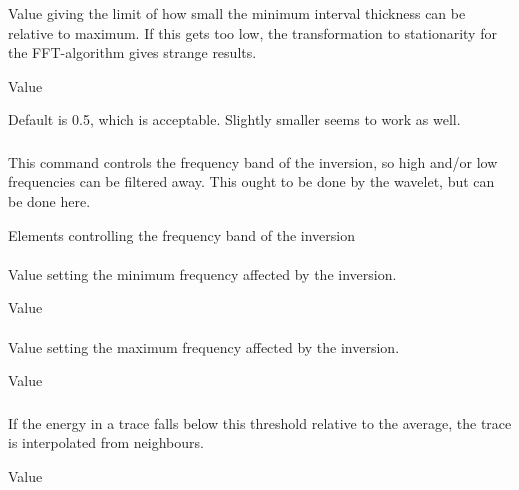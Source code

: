 \subsubsection{}
 \slist
   \item \Description Value giving the limit of how small the minimum interval thickness can be relative to maximum. If this gets too low, the transformation to stationarity for the FFT-algorithm gives strange results.
   \item \Argument Value
   \item \Default Default is 0.5, which is acceptable. Slightly smaller seems to work as well.
 \elist

\subsubsection{}
 \slist
   \item \Description This command controls the frequency band of the inversion, so high and/or low frequencies can be filtered away. This ought to be done by the wavelet, but can be done here.
   \item \Argument Elements controlling the frequency band of the inversion
   \item \Default
 \elist

\paragraph{}
 \slist
   \item \Description Value setting the minimum frequency affected by the inversion.
   \item \Argument Value
   \item {}
 \elist

\paragraph{}
 \slist
   \item \Description Value setting the maximum frequency affected by the inversion.
   \item \Argument Value
   \item {}
 \elist
 
\subsubsection{}
 \slist
   \item \Description If the energy in a trace falls below this threshold relative to the average, the trace is interpolated from neighbours.
   \item \Argument Value
   \item {}
 \elist

